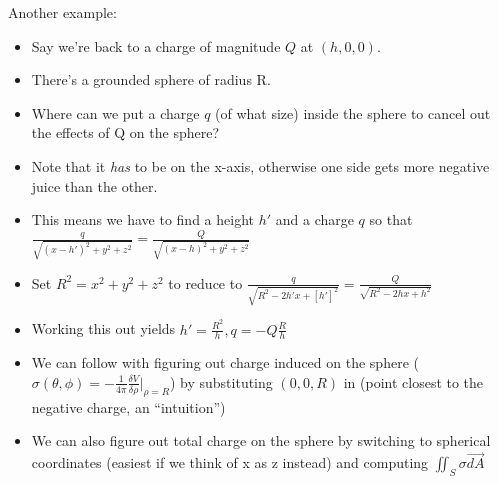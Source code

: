 \documentclass[11pt, oneside]{article}   	%
\begin{document}
Another example:
\begin{itemize}
\item Say we're back to a charge of magnitude $Q$ at $(h, 0, 0)$.
\item There's a grounded sphere of radius R.
\item Where can we put a charge $q$ (of what size) inside the sphere to cancel out the effects of Q on the sphere?
\item Note that it \emph{has} to be on the x-axis, otherwise one side gets more negative juice than the other.
\item This means we have to find a height $h'$ and a charge $q$ so that $\frac{q}{\sqrt{(x-h')^2 + y^2+z^2}} = \frac{Q}{\sqrt{(x-h)^2 + y^2+z^2}}$
\item Set $R^2 = x^2 + y^2 + z^2$ to reduce to $\frac{q}{\sqrt{R^2 -2h'x+[h']^2}} = \frac{Q}{\sqrt{R^2 - 2hx + h^2}}$
\item Working this out yields $h' = \frac{R^2}{h}, q = -Q\frac{R}{h}$
\item We can follow with figuring out charge induced on the sphere ($\sigma(\theta, \phi) = -\frac{1}{4\pi}\frac{\delta V}{\delta \rho}|_{\rho=R}$) by substituting $(0, 0, R)$ in (point closest to the negative charge, an ``intuition'')
\item We can also figure out total charge on the sphere by switching to spherical coordinates (easiest if we think of x as z instead) and computing $\iint_S \sigma \vec{dA}$
\end{itemize}
\end{document}
